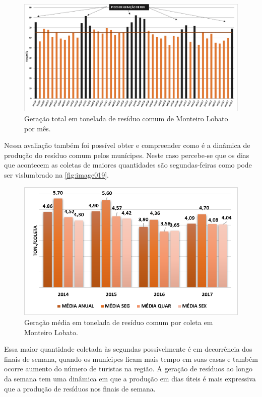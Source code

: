 \begin{landscape}
	
\begin{figure}
\centering
\includegraphics[width=1\linewidth]{produtos/prodtres/image018}
\caption{Geração total em tonelada de resíduo comum de Monteiro Lobato por mês.}
\label{fig:image018}
\end{figure}

\end{landscape}

Nessa avaliação também foi possível obter e compreender como é a dinâmica de produção do resíduo comum pelos munícipes. Neste caso percebe-se que os dias que acontecem as coletas de maiores quantidades são segundas-feiras como pode ser vislumbrado na \autoref{fig:image019}.

\begin{figure}
	\centering
	\includegraphics[width=0.7\linewidth]{produtos/prodtres/image019}
	\caption{Geração média em tonelada de resíduo comum por coleta em Monteiro Lobato.}
	\label{fig:image019}
\end{figure}

Essa maior quantidade coletada às segundas possivelmente é em decorrência dos finais de semana, quando os munícipes ficam mais tempo em suas casas e também ocorre aumento do número de turistas na região. A geração de resíduos ao longo da semana tem uma dinâmica em que a produção em dias úteis é mais expressiva que a produção de resíduos nos finais de semana.

